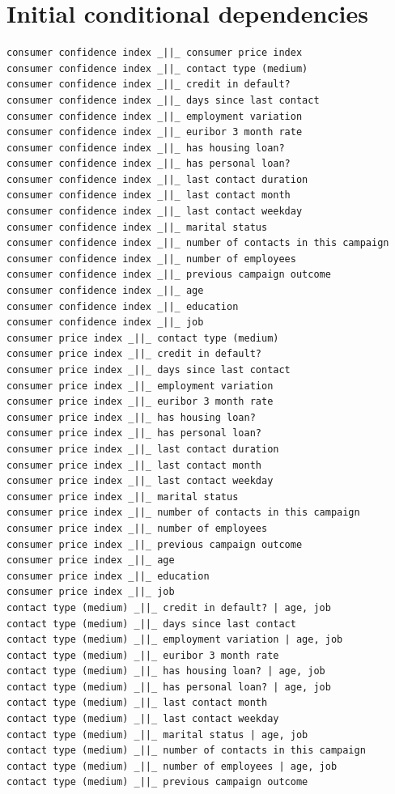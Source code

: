 \documentclass[11pt]{article}
\begin{document}
\section{Initial conditional dependencies}
\label{sec:initial_conditional_dependencies}
{\tiny\begin{verbatim}
consumer confidence index _||_ consumer price index
consumer confidence index _||_ contact type (medium)
consumer confidence index _||_ credit in default?
consumer confidence index _||_ days since last contact
consumer confidence index _||_ employment variation
consumer confidence index _||_ euribor 3 month rate
consumer confidence index _||_ has housing loan?
consumer confidence index _||_ has personal loan?
consumer confidence index _||_ last contact duration
consumer confidence index _||_ last contact month
consumer confidence index _||_ last contact weekday
consumer confidence index _||_ marital status
consumer confidence index _||_ number of contacts in this campaign
consumer confidence index _||_ number of employees
consumer confidence index _||_ previous campaign outcome
consumer confidence index _||_ age
consumer confidence index _||_ education
consumer confidence index _||_ job
consumer price index _||_ contact type (medium)
consumer price index _||_ credit in default?
consumer price index _||_ days since last contact
consumer price index _||_ employment variation
consumer price index _||_ euribor 3 month rate
consumer price index _||_ has housing loan?
consumer price index _||_ has personal loan?
consumer price index _||_ last contact duration
consumer price index _||_ last contact month
consumer price index _||_ last contact weekday
consumer price index _||_ marital status
consumer price index _||_ number of contacts in this campaign
consumer price index _||_ number of employees
consumer price index _||_ previous campaign outcome
consumer price index _||_ age
consumer price index _||_ education
consumer price index _||_ job
contact type (medium) _||_ credit in default? | age, job
contact type (medium) _||_ days since last contact
contact type (medium) _||_ employment variation | age, job
contact type (medium) _||_ euribor 3 month rate
contact type (medium) _||_ has housing loan? | age, job
contact type (medium) _||_ has personal loan? | age, job
contact type (medium) _||_ last contact month
contact type (medium) _||_ last contact weekday
contact type (medium) _||_ marital status | age, job
contact type (medium) _||_ number of contacts in this campaign
contact type (medium) _||_ number of employees | age, job
contact type (medium) _||_ previous campaign outcome

\end{verbatim}}
\end{document}
